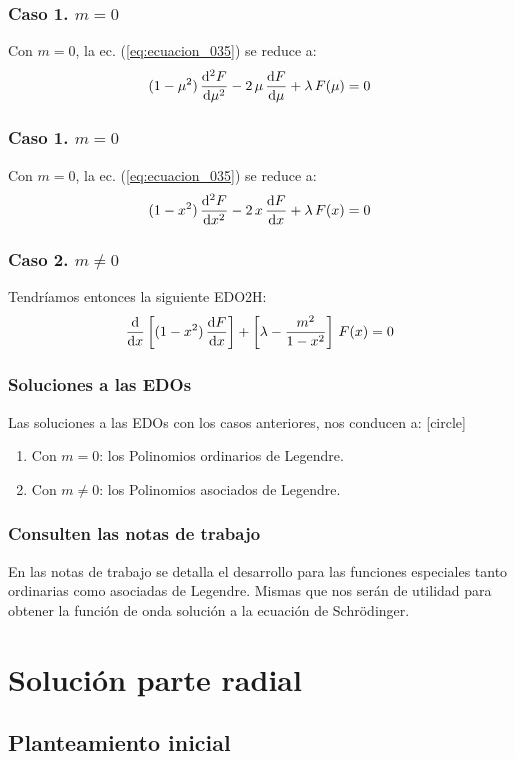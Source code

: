 \documentclass[12pt]{beamer}
\begin{document}
\begin{frame}
\frametitle{Caso 1. $m = 0$}
Con $m = 0$, la ec. (\ref{eq:ecuacion_035}) se reduce a:
\begin{align}
    (1 - \mu^{2}) \, \dv[2]{F}{\mu} - 2  \, \mu \, \dv{F}{\mu} + \lambda \, F(\mu) = 0
    \label{eq:ecuacion_036a}
\end{align}
\end{frame}
\begin{frame}
\frametitle{Caso 1. $m = 0$}
Con $m = 0$, la ec. (\ref{eq:ecuacion_035}) se reduce a:
\begin{align}
    (1 - x^{2}) \, \dv[2]{F}{x} - 2  \, x \, \dv{F}{x} + \lambda \, F(x) = 0
    \label{eq:ecuacion_036b}
\end{align}
\end{frame}
\begin{frame}
\frametitle{Caso 2. $m \neq 0$}
Tendríamos entonces la siguiente EDO2H:
\begin{align}
\dv{x} \left[ (1 - x^{2}) \, \dv{F}{x} \right] + \left[ \lambda - \dfrac{m^{2}}{1 - x^{2}} \right] \, F(x) = 0
\label{eq:ecuacion_037}
\end{align}
\end{frame}
\begin{frame}
\frametitle{Soluciones a las EDOs}
Las soluciones a las EDOs con los casos anteriores, nos conducen a:
\pause
{}
[circle]
\begin{enumerate}[<+->]
\item Con $m = 0$: los Polinomios ordinarios de Legendre.
\item Con $m \neq 0$: los Polinomios asociados de Legendre.
\end{enumerate}
\end{frame}
\begin{frame}
\frametitle{Consulten las notas de trabajo}
En las notas de trabajo se detalla el desarrollo para las funciones especiales tanto ordinarias como asociadas de Legendre.
\pause
Mismas que nos serán de utilidad para obtener la función de onda solución a la ecuación de Schrödinger.
\end{frame}

\section{Solución parte radial}
\subsection{Planteamiento inicial}
\end{document}

